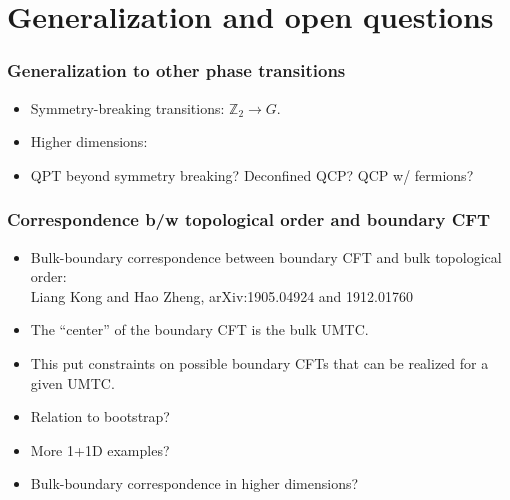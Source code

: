 \documentclass[xcolor=table, 10pt, aspectratio=169]{beamer}
\begin{document}
\section{Generalization and open questions}

\begin{frame}
  \frametitle{Generalization to other phase transitions}
  \begin{itemize}
    \item Symmetry-breaking transitions: $\mathbb Z_2\rightarrow G$.
    \item Higher dimensions:
    \item QPT beyond symmetry breaking? Deconfined QCP? QCP w/ fermions?
  \end{itemize}
\end{frame}

\begin{frame}
  \frametitle{Correspondence b/w topological order and boundary CFT}
  \begin{itemize}
    \item Bulk-boundary correspondence between boundary CFT and bulk topological order:\\
    Liang Kong and Hao Zheng, arXiv:1905.04924 and 1912.01760
    \item The ``center'' of the boundary CFT is the bulk UMTC.
    \item This put constraints on possible boundary CFTs that can be realized for a given UMTC.
    \item Relation to bootstrap?
    \item More 1+1D examples?
    \item Bulk-boundary correspondence in higher dimensions?
  \end{itemize}
\end{frame}
\end{document}
